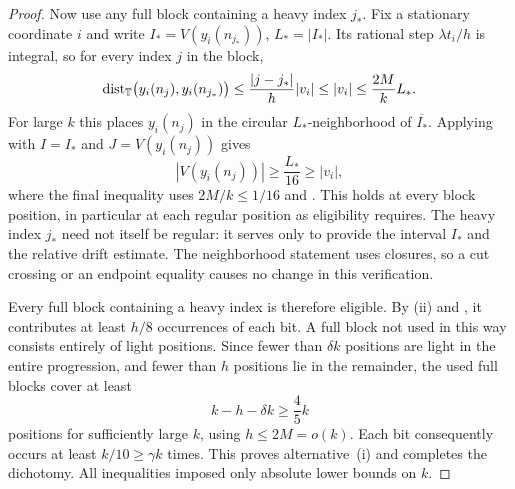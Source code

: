 \begin{proof}
Now use any full block containing a heavy index $j_*$.
Fix a stationary coordinate $i$ and write
$I_*=V(y_i(n_{j_*}))$, $L_*=|I_*|$. Its rational step
$\lambda t_i/h$ is integral, so for every index $j$ in the block,
\[
 \operatorname{dist}_{\mathbb T}\bigl(y_i(n_j),y_i(n_{j_*})\bigr)
 \le\frac{|j-j_*|}{h}|v_i|
 \le|v_i|\le\frac{2M}{k}L_*.
\]
For large $k$ this places $y_i(n_j)$ in the circular
$L_*$-neighborhood of $\overline{I_*}$. Applying
 with $I=I_*$ and
$J=V(y_i(n_j))$ gives
\[
 |V(y_i(n_j))|\ge\frac{L_*}{16}\ge|v_i|,
\]
where the final inequality uses $2M/k\le1/16$ and
. This holds at every block position,
in particular at each regular position as eligibility requires.
The heavy index $j_*$ need not itself be regular: it serves only to
provide the interval $I_*$ and the relative drift estimate.
The neighborhood statement uses closures, so a cut crossing or an
endpoint equality causes no change in this verification.

Every full block containing a heavy index is therefore eligible.
By \textup{(ii)} and
, it contributes at least $h/8$
occurrences of each bit. A full block not used in this way consists
entirely of light positions. Since fewer than $\delta k$ positions
are light in the entire progression, and fewer than $h$ positions
lie in the remainder, the used full blocks cover at least
\[
 k-h-\delta k\ge\frac45 k
\]
positions for sufficiently large $k$, using $h\le2M=o(k)$.
Each bit consequently occurs at least $k/10\ge\gamma k$ times.
This proves alternative~\textup{(i)} and completes the dichotomy.
All inequalities imposed only absolute lower bounds on $k$.
\end{proof}
